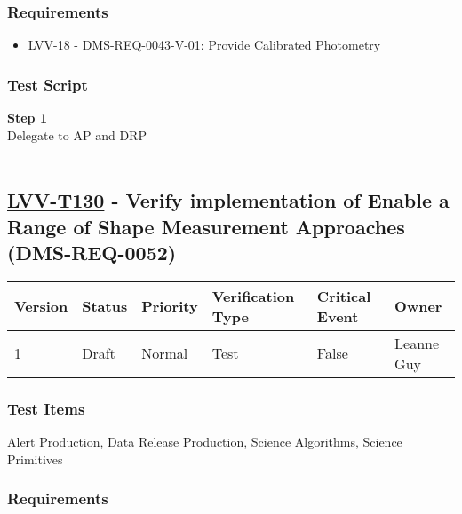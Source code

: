 \hypertarget{requirements-106}{%
\subsubsection{Requirements}\label{requirements-106}}

\begin{itemize}
\tightlist
\item
  \href{https://jira.lsstcorp.org/browse/LVV-18}{LVV-18} -
  DMS-REQ-0043-V-01: Provide Calibrated Photometry
\end{itemize}

\hypertarget{test-script-106}{%
\subsubsection{Test Script}\label{test-script-106}}

\textbf{Step 1}\\
Delegate to AP and DRP\\
~\\

\hypertarget{lvv-t130---verify-implementation-of-enable-a-range-of-shape-measurement-approaches-dms-req-0052}{%
\subsection{\texorpdfstring{\href{https://jira.lsstcorp.org/secure/Tests.jspa\#/testCase/LVV-T130}{LVV-T130}
- Verify implementation of Enable a Range of Shape Measurement
Approaches
(DMS-REQ-0052)}{LVV-T130 - Verify implementation of Enable a Range of Shape Measurement Approaches (DMS-REQ-0052)}}\label{lvv-t130---verify-implementation-of-enable-a-range-of-shape-measurement-approaches-dms-req-0052}}

\begin{longtable}[]{@{}llllll@{}}
\toprule
Version & Status & Priority & Verification Type & Critical Event &
Owner\tabularnewline
\midrule
\endhead
1 & Draft & Normal & Test & False & Leanne Guy\tabularnewline
\bottomrule
\end{longtable}

\hypertarget{test-items-106}{%
\subsubsection{Test Items}\label{test-items-106}}

Alert Production, Data Release Production, Science Algorithms, Science
Primitives~

\hypertarget{requirements-107}{%
\subsubsection{Requirements}\label{requirements-107}}

